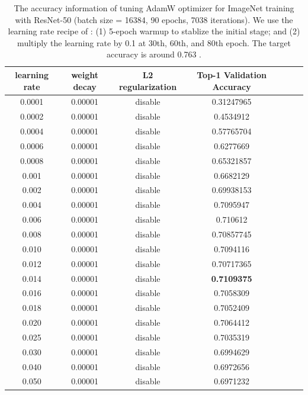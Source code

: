 \begin{table}[ht]
\renewcommand{\arraystretch}{1.3}
\caption{The accuracy information of tuning AdamW optimizer for ImageNet training with ResNet-50 (batch size = 16384, 90 epochs, 7038 iterations). We use the learning rate recipe of \citep{goyal2017accurate}: (1) 5-epoch warmup to stablize the initial stage; and (2) multiply the learning rate by 0.1 at 30th, 60th, and 80th epoch. The target accuracy is around 0.763 \citep{goyal2017accurate}.}
\centering
\begin{tabular}{|c|c|c|c|c|c|c|}
\hline
learning rate & weight decay & L2 regularization & Top-1 Validation Accuracy \\
\hline
\hline
0.0001 & 0.00001 & disable & 0.31247965 \\
\hline
0.0002 & 0.00001 & disable & 0.4534912 \\
\hline
0.0004 & 0.00001 & disable & 0.57765704 \\
\hline
0.0006 & 0.00001 & disable & 0.6277669 \\
\hline
0.0008 & 0.00001 & disable & 0.65321857 \\
\hline
0.001 & 0.00001 & disable & 0.6682129 \\
\hline
0.002 & 0.00001 & disable & 0.69938153 \\
\hline
0.004 & 0.00001 & disable & 0.7095947 \\
\hline
0.006 & 0.00001 & disable & 0.710612 \\
\hline
0.008 & 0.00001 & disable & 0.70857745 \\
\hline
0.010 & 0.00001 & disable & 0.7094116 \\
\hline
0.012 & 0.00001 & disable & 0.70717365 \\
\hline
0.014 & 0.00001 & disable & {\bf 0.7109375} \\
\hline
0.016 & 0.00001 & disable & 0.7058309 \\
\hline
0.018 & 0.00001 & disable & 0.7052409 \\
\hline
0.020 & 0.00001 & disable & 0.7064412 \\
\hline
0.025 & 0.00001 & disable & 0.7035319 \\
\hline
0.030 & 0.00001 & disable & 0.6994629 \\
\hline
0.040 & 0.00001 & disable & 0.6972656 \\
\hline
0.050 & 0.00001 & disable & 0.6971232 \\
\hline
\end{tabular}
\label{table:imagenet_adam_tuning_nol2_3}
\end{table}